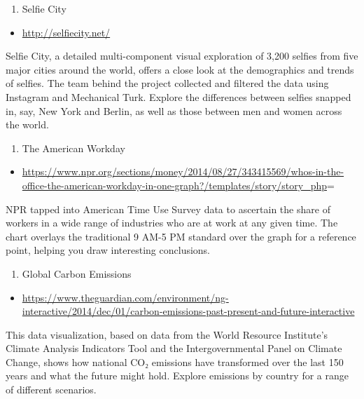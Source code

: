 \documentclass[]{book}
\providecommand{\tightlist}{%
  \setlength{\itemsep}{0pt}\setlength{\parskip}{0pt}}
\theoremstyle{definition}
\theoremstyle{definition}
\theoremstyle{definition}
\theoremstyle{remark}
\begin{document}
\begin{enumerate}
\def\labelenumi{\arabic{enumi}.}
\setcounter{enumi}{12}
\tightlist
\item
  Selfie City
\end{enumerate}

\begin{itemize}
\tightlist
\item
  \url{http://selfiecity.net/}
\end{itemize}

Selfie City, a detailed multi-component visual exploration of 3,200
selfies from five major cities around the world, offers a close look at
the demographics and trends of selfies. The team behind the project
collected and filtered the data using Instagram and Mechanical Turk.
Explore the differences between selfies snapped in, say, New York and
Berlin, as well as those between men and women across the world.

\begin{enumerate}
\def\labelenumi{\arabic{enumi}.}
\setcounter{enumi}{13}
\tightlist
\item
  The American Workday
\end{enumerate}

\begin{itemize}
\tightlist
\item
  \url{https://www.npr.org/sections/money/2014/08/27/343415569/whos-in-the-office-the-american-workday-in-one-graph?/templates/story/story_php}=
\end{itemize}

NPR tapped into American Time Use Survey data to ascertain the share of
workers in a wide range of industries who are at work at any given time.
The chart overlays the traditional 9 AM-5 PM standard over the graph for
a reference point, helping you draw interesting conclusions.

\begin{enumerate}
\def\labelenumi{\arabic{enumi}.}
\setcounter{enumi}{14}
\tightlist
\item
  Global Carbon Emissions
\end{enumerate}

\begin{itemize}
\tightlist
\item
  \url{https://www.theguardian.com/environment/ng-interactive/2014/dec/01/carbon-emissions-past-present-and-future-interactive}
\end{itemize}

This data visualization, based on data from the World Resource
Institute's Climate Analysis Indicators Tool and the Intergovernmental
Panel on Climate Change, shows how national CO₂ emissions have
transformed over the last 150 years and what the future might hold.
Explore emissions by country for a range of different scenarios.
\end{document}
